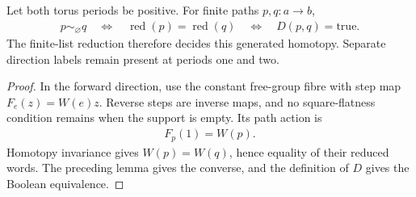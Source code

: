 \begin{lemma}
    \label{lem:peps_dual_empty_support_normal_form}
    \leanok
    Let both torus periods be positive. For finite paths $p,q:a\to b$,
    \begin{align}
        p\sim_{\varnothing}q
        \quad\Longleftrightarrow\quad
        \operatorname{red}(p)=\operatorname{red}(q)
        \quad\Longleftrightarrow\quad D(p,q)=\mathrm{true}.
        \label{eq:peps_dual_empty_support_classification}
    \end{align}
    The finite-list reduction therefore decides this generated homotopy.
    Separate direction labels remain present at periods one and two.
\end{lemma}
\begin{proof}\leanok
    In the forward direction, use the constant free-group fibre with step
    map $F_e(z)=W(e)z$. Reverse steps are inverse maps, and no square-flatness
    condition remains when the support is empty. Its path action is
    \begin{align}
        F_p(1)=W(p).
        \label{eq:peps_dual_empty_support_free_transport}
    \end{align}
    Homotopy invariance gives $W(p)=W(q)$, hence equality of their reduced words.
    The preceding lemma gives the converse, and the definition of $D$ gives
    the Boolean equivalence.
\end{proof}

